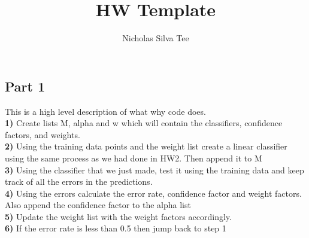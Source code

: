 \documentclass[letter]{article}
\title{HW Template}
\author{Nicholas Silva Tee}
\theoremstyle{case}
\begin{document}
\subsection*{Part 1}
This is a high level description of what why code does. \\
\textbf{1)} Create lists M, alpha and w which will contain the classifiers, confidence factors, and weights. \\
\textbf{2)} Using the training data points and the weight list create a linear classifier using the same process as we had done in HW2. Then append it to M \\
\textbf{3)} Using the classifier that we just made, test it using the training data and keep track of all the errors in the predictions.\\
\textbf{4)} Using the errors calculate the error rate, confidence factor and weight factors. Also append the confidence factor to the alpha list\\
\textbf{5)} Update the weight list with the weight factors accordingly.\\
\textbf{6)} If the error rate is less than 0.5 then jump back to step 1
\newpage
\end{document}
